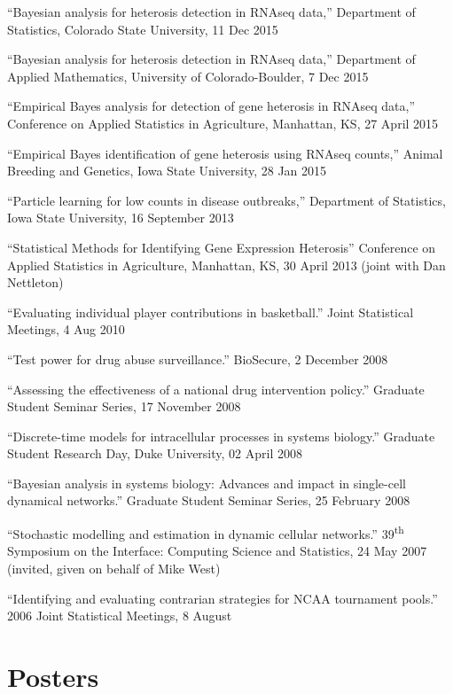 \documentclass[overlapped,line]{res}
\newcommand{\sinceappt}{}
\begin{document}
\begin{resume}
{\small

``Bayesian analysis for heterosis detection in RNAseq data,'' Department of Statistics, Colorado State University, 11 Dec 2015

``Bayesian analysis for heterosis detection in RNAseq data,'' Department of Applied Mathematics, University of Colorado-Boulder, 7 Dec 2015

``Empirical Bayes analysis for detection of gene heterosis in RNAseq data,'' Conference on Applied Statistics in Agriculture, Manhattan, KS, 27 April 2015 

``Empirical Bayes identification of gene heterosis using RNAseq counts,'' Animal Breeding and Genetics, Iowa State University, 28 Jan 2015 

``Particle learning for low counts in disease outbreaks,'' Department of Statistics, Iowa State University, 16 September 2013 

``Statistical Methods for Identifying Gene Expression Heterosis'' Conference on Applied Statistics in Agriculture, Manhattan, KS, 30 April 2013 (joint with Dan Nettleton)

\sinceappt

``Evaluating individual player contributions in basketball.'' Joint Statistical Meetings, 4 Aug 2010 

``Test power for drug abuse surveillance.'' BioSecure, 2 December 2008 

``Assessing the effectiveness of a national drug intervention policy.'' Graduate Student Seminar Series, 17 November 2008 

``Discrete-time models for intracellular processes in systems biology.'' Graduate Student Research Day, Duke University, 02 April 2008 

``Bayesian analysis in systems biology: Advances and impact in single-cell dynamical networks.'' Graduate Student Seminar Series, 25 February 2008 

``Stochastic modelling and estimation in dynamic cellular networks.'' 39\textsuperscript{th} Symposium on the Interface: Computing Science and Statistics, 24 May 2007 (invited, given on behalf of Mike West)

``Identifying and evaluating contrarian strategies for NCAA tournament pools.'' 2006 Joint Statistical Meetings, 8 August 

}


\section{\bf Posters}


\end{resume}
\end{document}
